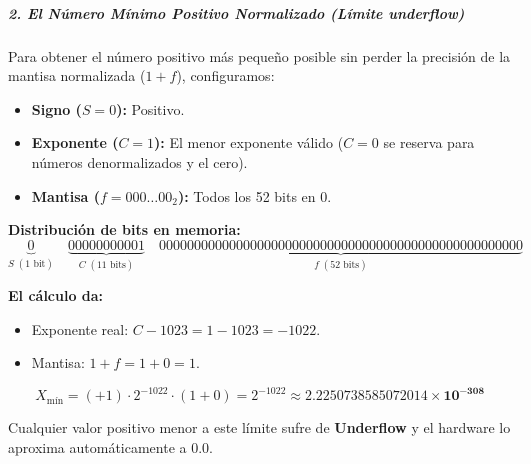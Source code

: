\documentclass[12pt]{article}
\begin{document}
\subparagraph{2. El Número Mínimo Positivo Normalizado (Límite underflow)}
Para obtener el número positivo más pequeño posible sin perder la precisión de la mantisa
 normalizada ($1+f$), configuramos:
\begin{itemize}
    \item \textbf{Signo ($S = 0$):} Positivo.
    \item \textbf{Exponente ($C = 1$):} El menor exponente válido ($C = 0$ se reserva para números denormalizados y el cero).
    \item \textbf{Mantisa ($f = 000\dots00_2$):} Todos los 52 bits en $0$.
\end{itemize}

\noindent \textbf{Distribución de bits en memoria:}
\[
\underbrace{0}_{S \; (1\text{ bit})} \quad \underbrace{00000000001}_{C \; (11\text{ bits})} \quad \underbrace{0000000000000000000000000000000000000000000000000000}_{f \; (52\text{ bits})}
\]

\noindent \textbf{El cálculo da:}
\begin{itemize}
    \item Exponente real: $C - 1023 = 1 - 1023 = -1022$.
    \item Mantisa: $1 + f = 1 + 0 = 1$.
\end{itemize}

\[
X_{\text{mín}} = (+1) \cdot 2^{-1022} \cdot (1 + 0) = 2^{-1022} \approx \mathbf{2.2250738585072014 \times 10^{-308}}
\]

\noindent Cualquier valor positivo menor a este límite sufre de \textbf{Underflow} y el hardware lo aproxima automáticamente a $0.0$.
\end{document}

